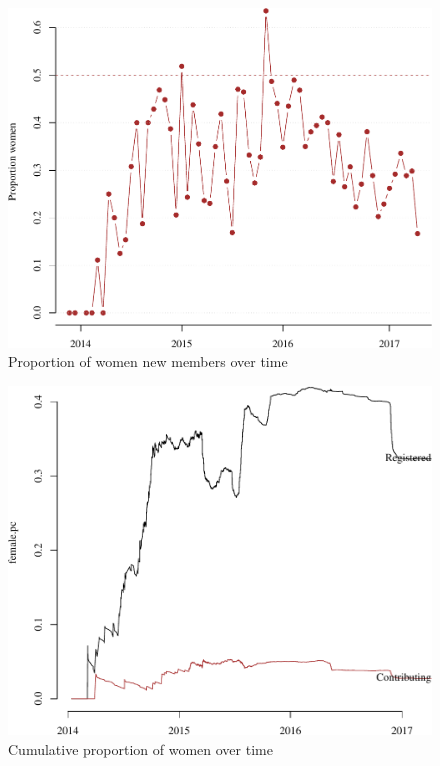 \begin{frame}

\begin{figure}
\centering
\includegraphics{Figures/overtime-1.pdf}
\caption{Proportion of women new members over time}
\end{figure}

\end{frame}

\begin{frame}

\begin{figure}
\centering
\includegraphics{Figures/cumsum-1.pdf}
\caption{Cumulative proportion of women over time}
\end{figure}

\end{frame}

